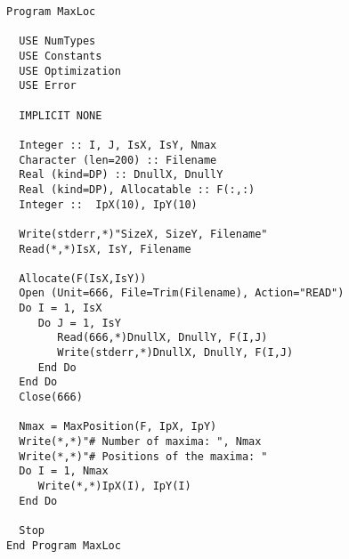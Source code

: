 \begin{lstlisting}[emph=MaxPosition,emphstyle=\color{blue},frame=trBL,caption=Example
  of the usage of the routine \texttt{MaxPosition}., label=MaxPosition]
Program MaxLoc

  USE NumTypes
  USE Constants 
  USE Optimization
  USE Error
  
  IMPLICIT NONE

  Integer :: I, J, IsX, IsY, Nmax
  Character (len=200) :: Filename
  Real (kind=DP) :: DnullX, DnullY
  Real (kind=DP), Allocatable :: F(:,:)
  Integer ::  IpX(10), IpY(10)

  Write(stderr,*)"SizeX, SizeY, Filename"
  Read(*,*)IsX, IsY, Filename

  Allocate(F(IsX,IsY))
  Open (Unit=666, File=Trim(Filename), Action="READ")
  Do I = 1, IsX
     Do J = 1, IsY
        Read(666,*)DnullX, DnullY, F(I,J)
        Write(stderr,*)DnullX, DnullY, F(I,J)
     End Do
  End Do
  Close(666)

  Nmax = MaxPosition(F, IpX, IpY)
  Write(*,*)"# Number of maxima: ", Nmax
  Write(*,*)"# Positions of the maxima: "
  Do I = 1, Nmax
     Write(*,*)IpX(I), IpY(I)
  End Do

  Stop
End Program MaxLoc
\end{lstlisting}




